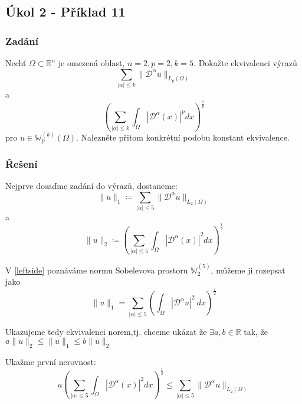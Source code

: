 \documentclass[../main.tex]{subfiles}
\begin{document}
\subsection{Úkol 2 - Příklad 11}
\subsubsection{Zadání}

Nechť $\Omega\subset\mathbb{R}^n$ je omezená oblast, $n=2, p=2, k=5$. Dokažte ekvivalenci výrazů
\begin{equation}%
     \sum_{|\alpha| \leq k} \| \mathcal{D}^\alpha u \|_{L_p(\Omega)}
\end{equation}
a
\begin{equation}%
     \left( \sum_{|\alpha| \leq k} \int_\Omega | \mathcal{D}^\alpha(x)|^p dx\right)^\frac{1}{p}
\end{equation}
pro $u \in \mathbb{W}_p^{(k)}(\Omega)$. Nalezněte přitom konkrétní podobu konstant ekvivalence.

\subsubsection{Řešení}
Nejprve dosaďme zadání do výrazů, dostaneme: 
\begin{equation}\label{leftside}
    \| u \|_1 \coloneq \sum_{|\alpha| \leq 5} \| \mathcal{D}^\alpha u \|_{L_2(\Omega)} 
\end{equation}
a
\begin{equation}\label{rightside}
    \| u \|_2 \coloneq \left( \sum_{|\alpha| \leq 5} \int_\Omega | \mathcal{D}^\alpha(x)|^2 dx\right)^\frac{1}{2}
\end{equation}

V \eqref{leftside} poznáváme normu Sobelevova prostoru $\mathbb{W}_2^{(5)}$, můžeme ji rozepsat jako
\begin{equation}
    \| u \|_1 = \sum_{|\alpha| \leq 5} \left( \int_\Omega| \mathcal{D}^\alpha u |^2 \ dx  \right)^\frac{1}{2}
\end{equation}

Ukazujeme tedy ekvivalenci norem,\hfill\break tj. chceme ukázat že $\exists a,b \in \mathbb{R}$ tak, že $a\|u\|_2 \leq \|u\|_1 \leq b\|u\|_2$



Ukažme první nerovnost: 
\begin{equation*}
     a \left( \sum_{|\alpha| \leq 5} \int_\Omega | \mathcal{D}^\alpha(x)|^2 dx\right)^\frac{1}{2} \leq  \sum_{|\alpha| \leq 5} \| \mathcal{D}^\alpha u \|_{L_2(\Omega)} 
\end{equation*} 
\end{document}
